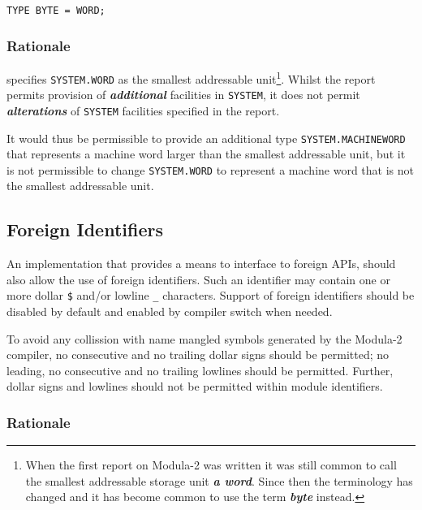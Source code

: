 \documentclass[10pt,a4paper]{article}
\renewcommand{\emph}[1]{\textbf{\textit{#1}}}
\begin{document}
\lstset{style=modula2}
\begin{lstlisting}
TYPE BYTE = WORD;
\end{lstlisting}

\subsubsection{Rationale}

\cite{Wirth88} specifies \verb|SYSTEM.WORD| as the smallest addressable
unit\footnote{When the first report on Modula-2 was written it was still common
to call the smallest addressable storage unit \emph{a word}. Since then the
terminology has changed and it has become common to use the term \emph{byte}
instead.}. Whilst the report permits provision of \emph{additional} facilities
in \verb|SYSTEM|, it does not permit \emph{alterations} of \verb|SYSTEM|
facilities specified in the report.

It would thus be permissible to provide an additional type
\verb|SYSTEM.MACHINEWORD| that represents a machine word larger than the
smallest addressable unit, but it is not permissible to change
\verb|SYSTEM.WORD| to represent a machine word that is not the smallest
addressable unit.


\subsection{Foreign Identifiers}

An implementation that provides a means to interface to \glspl{foreign API},
should also allow the use of \glspl{foreign identifier}. Such an identifier may
contain one or more dollar \verb|$| and/or lowline \verb|_| characters. Support
of \glspl{foreign identifier} should be disabled by default and enabled by
compiler switch when needed.

To avoid any collission with name mangled symbols generated by the Modula-2
compiler, no consecutive and no trailing dollar signs should be permitted; no
leading, no consecutive and no trailing lowlines should be permitted. Further,
dollar signs and lowlines should not be permitted within module identifiers. 

\subsubsection{Rationale}
\end{document}
